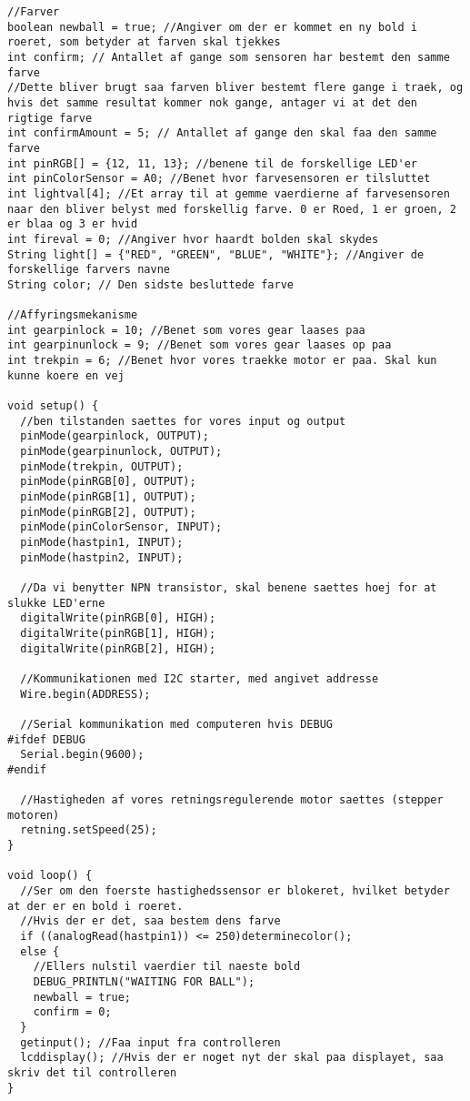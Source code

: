 \begin{lstlisting}
//Farver
boolean newball = true; //Angiver om der er kommet en ny bold i roeret, som betyder at farven skal tjekkes
int confirm; // Antallet af gange som sensoren har bestemt den samme farve
//Dette bliver brugt saa farven bliver bestemt flere gange i traek, og hvis det samme resultat kommer nok gange, antager vi at det den rigtige farve
int confirmAmount = 5; // Antallet af gange den skal faa den samme farve
int pinRGB[] = {12, 11, 13}; //benene til de forskellige LED'er
int pinColorSensor = A0; //Benet hvor farvesensoren er tilsluttet
int lightval[4]; //Et array til at gemme vaerdierne af farvesensoren naar den bliver belyst med forskellig farve. 0 er Roed, 1 er groen, 2 er blaa og 3 er hvid
int fireval = 0; //Angiver hvor haardt bolden skal skydes
String light[] = {"RED", "GREEN", "BLUE", "WHITE"}; //Angiver de forskellige farvers navne
String color; // Den sidste besluttede farve

//Affyringsmekanisme
int gearpinlock = 10; //Benet som vores gear laases paa
int gearpinunlock = 9; //Benet som vores gear laases op paa
int trekpin = 6; //Benet hvor vores traekke motor er paa. Skal kun kunne koere en vej

void setup() {
  //ben tilstanden saettes for vores input og output
  pinMode(gearpinlock, OUTPUT);
  pinMode(gearpinunlock, OUTPUT);
  pinMode(trekpin, OUTPUT);
  pinMode(pinRGB[0], OUTPUT);
  pinMode(pinRGB[1], OUTPUT);
  pinMode(pinRGB[2], OUTPUT);
  pinMode(pinColorSensor, INPUT);
  pinMode(hastpin1, INPUT);
  pinMode(hastpin2, INPUT);

  //Da vi benytter NPN transistor, skal benene saettes hoej for at slukke LED'erne
  digitalWrite(pinRGB[0], HIGH);
  digitalWrite(pinRGB[1], HIGH);
  digitalWrite(pinRGB[2], HIGH);

  //Kommunikationen med I2C starter, med angivet addresse
  Wire.begin(ADDRESS);

  //Serial kommunikation med computeren hvis DEBUG
#ifdef DEBUG
  Serial.begin(9600);
#endif

  //Hastigheden af vores retningsregulerende motor saettes (stepper motoren)
  retning.setSpeed(25);
}

void loop() {
  //Ser om den foerste hastighedssensor er blokeret, hvilket betyder at der er en bold i roeret.
  //Hvis der er det, saa bestem dens farve
  if ((analogRead(hastpin1)) <= 250)determinecolor();
  else {
    //Ellers nulstil vaerdier til naeste bold
    DEBUG_PRINTLN("WAITING FOR BALL");
    newball = true;
    confirm = 0;
  }
  getinput(); //Faa input fra controlleren
  lcddisplay(); //Hvis der er noget nyt der skal paa displayet, saa skriv det til controlleren
}



\end{lstlisting}

